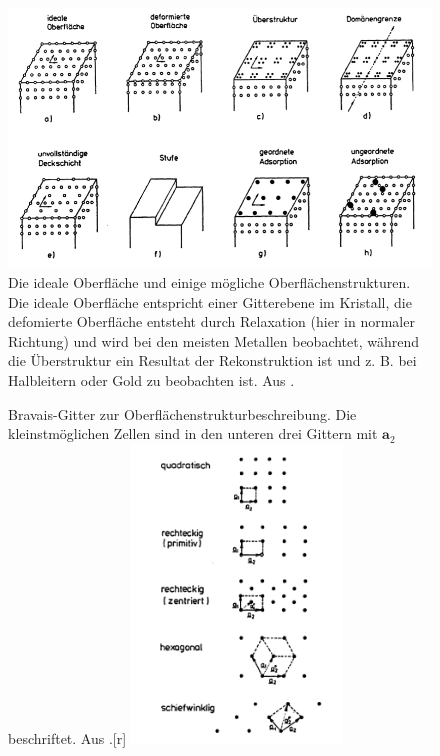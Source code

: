 \begin{figure}
    \includegraphics[width=1.0\textwidth]{pics/oberflaechenstruktur}
    \caption{Die ideale Oberfläche und einige mögliche Oberflächenstrukturen. 
Die ideale Oberfläche entspricht einer Gitterebene im Kristall, die defomierte 
Oberfläche entsteht durch Relaxation (hier in normaler Richtung) und wird bei den 
meisten Metallen beobachtet, während die Überstruktur ein Resultat der Rekonstruktion 
ist und z. B. bei Halbleitern oder Gold zu beobachten ist. 
Aus \cite{henzler1991oberflachenphysik}.}
\label{fig:oberflaeche}
\end{figure} 
\begin{figure}
  \begin{captionbeside}{Bravais-Gitter zur Oberflächenstrukturbeschreibung. Die 
kleinstmöglichen Zellen sind in den unteren drei Gittern mit $\mathbf{a}_2$ 
beschriftet.
Aus \cite{henzler1991oberflachenphysik}.}[r]
    \includegraphics[width=0.5\textwidth]{pics/Bravais}
  \end{captionbeside}
  \label{fig:Bravais}
\end{figure} 


